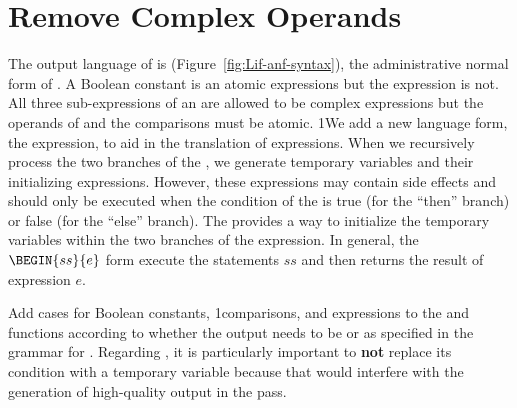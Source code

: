 \documentclass[7x10,nocrop]{TimesAPriori_MIT}%
\def\pythonEd{1}
\def\edition{0}
\newcommand{\python}[1]{{\if\edition\pythonEd #1\fi}}
\begin{document}
\section{Remove Complex Operands}
\label{sec:remove-complex-opera-Lif}

The output language of  is
\LangIfANF{} (Figure~\ref{fig:Lif-anf-syntax}), the administrative
normal form of \LangIf{}.  A Boolean constant is an atomic expressions
but the  expression is not.  All three sub-expressions of an
 are allowed to be complex expressions but the operands of
 and the comparisons must be atomic.
%
\python{We add a new language form, the  expression, to aid
  in the translation of \code{if} expressions. When we recursively
  process the two branches of the \code{if}, we generate temporary
  variables and their initializing expressions. However, these
  expressions may contain side effects and should only be executed
  when the condition of the \code{if} is true (for the ``then''
  branch) or false (for the ``else'' branch). The \code{Begin} provides
  a way to initialize the temporary variables within the two branches
  of the \code{if} expression.  In general, the $\BEGIN{ss}{e}$
  form execute the statements $ss$ and then returns the result of
  expression $e$.}

Add cases for Boolean constants, \python{comparisons,} and 
expressions to the  and  functions
according to whether the output needs to be \Exp{} or \Atm{} as
specified in the grammar for \LangIfANF{}.  Regarding , it is
particularly important to \textbf{not} replace its condition with a
temporary variable because that would interfere with the generation of
high-quality output in the  pass.


\newcommand{\LifMonadASTPython}{
\begin{array}{rcl}
\Atm &::=& \BOOL{\itm{bool}}\\
\Exp &::=& \CMP{\Atm}{\itm{cmp}}{\Atm} \MID \IF{\Exp}{\Exp}{\Exp} \\
  &\MID& \BEGIN{\Stmt^{*}}{\Exp}\\
\Stmt{} &::=& \IFSTMT{\Exp}{\Stmt^{*}}{\Stmt^{*}}
\end{array}
}
\end{document}
